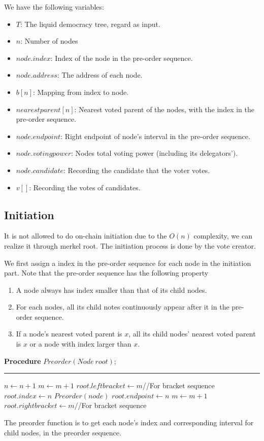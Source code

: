 We have the following variables:
\begin{itemize}
	\item $T$: The liquid democracy tree, regard as input.
	\item $n$: Number of nodes
	\item $node.index$: Index of the node in the pre-order sequence.
	\item $node.address$: The address of each node.
	\item $b[n]$: Mapping from index to node.
	\item $nearestparent[n]$: Nearest voted parent of the nodes, with the index in the pre-order sequence.
	\item $node.endpoint$: Right endpoint of node's interval in the pre-order sequence.
	\item $node.votingpower$: Nodes total voting power (including its delegators').
	\item $node.candidate$: Recording the candidate that the voter votes.
	\item $v[]$: Recording the votes of candidates.
\end{itemize}

\subsection{Initiation}
It is not allowed to do on-chain initiation due to the $O(n)$ complexity, we
can realize it through merkel root. The initiation process is done by the vote
creator.

We first assign a index in the pre-order sequence for each node in the initiation part. Note that the pre-order sequence has the following property
\begin{enumerate}
	\item A node always has index smaller than that of its child nodes.
    \item For each nodes, all its child notes continuously appear after it in the pre-order sequence.
	\item If a node's nearest voted parent is $x$, all its child nodes' nearest voted parent is $x$ or a node with index larger than $x$.
\end{enumerate}
\begin{algorithm}
	\label{alg:preorder}
	\textbf{Procedure} $Preorder(Node~root)$;
	\hrule
	$n \leftarrow n+1$\;
	$m \leftarrow m+1$\;
	$root.leftbracket \leftarrow m${\color{gray}//For bracket sequence}\;
	$root.index \leftarrow n$\;
	{
		$Preorder(node)$
	}
	$root.endpoint \leftarrow n$\;
	$m \leftarrow m+1$\;
	$root.rightbracket \leftarrow m${\color{gray}//For bracket sequence}\;
\end{algorithm}
The preorder function is to get each node's index and corresponding interval for child nodes, in the preorder sequence.

